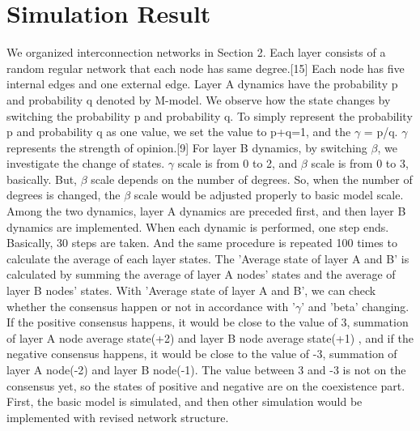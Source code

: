 \documentclass[english]{cccconf}
\begin{document}
\section{Simulation Result}
    We organized interconnection networks in Section 2. Each layer consists of a random regular network that each node has same degree.[15] Each node has five internal edges and one external edge. Layer A dynamics have the probability p and probability q denoted by M-model. We observe how the state changes by switching the probability p and probability q. To simply represent the probability p and probability q as one value, we set the value to p+q=1, and the $\gamma$ = p/q. $\gamma$ represents the strength of opinion.[9] For layer B dynamics, by switching $\beta$, we investigate the change of states. $\gamma$ scale is from 0 to 2, and $\beta$ scale is from 0 to 3, basically. But, $\beta$ scale depends on the number of degrees. So, when the number of degrees is changed, the $\beta$ scale would be adjusted properly to basic model scale. 
Among the two dynamics, layer A dynamics are preceded first, and then layer B dynamics are implemented. When each dynamic is performed, one step ends. Basically, 30 steps are taken. And the same procedure is repeated 100 times to calculate the average of each layer states.
The 'Average state of layer A and B' is calculated by summing the average of layer A nodes’ states and the average of layer B nodes' states. With 'Average state of layer A and B', we can check whether the consensus happen or not in accordance with '$\gamma$' and 'beta' changing.  If the positive consensus happens, it would be close to the value of 3, summation of layer A node average state(+2) and layer B node average state(+1) , and if the negative consensus happens, it would be close to the value of -3, summation of layer A node(-2) and layer B node(-1). The value between 3 and -3 is not on the consensus yet, so the states of positive and negative are on the coexistence part. 
First, the basic model is simulated, and then other simulation would be implemented with revised network structure.
\end{document}

